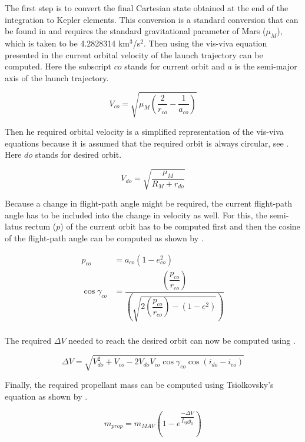 The first step is to convert the final Cartesian state obtained at the end of the integration to Kepler elements. This conversion is a standard conversion that can be found in \cite{wakker2010} and requires the standard gravitational parameter of Mars ($\mu_{M}$), which is taken to be 4.2828314 km$^{3}$/s$^{2}$. Then using the vis-viva equation presented in  the current orbital velocity of the launch trajectory can be computed. Here the subscript $co$ stands for current orbit and $a$ is the semi-major axis of the launch trajectory.

\begin{equation} \label{eq:visViva}
V_{co} = \sqrt{\mu_{M}\left(\dfrac{2}{r_{co}}-\dfrac{1}{a_{co}}\right)}
\end{equation}

Then he required orbital velocity is a simplified representation of the vis-viva equations because it is assumed that the required orbit is always circular, see . Here $do$ stands for desired orbit.

\begin{equation} \label{eq:simpVisViva}
V_{do}=\sqrt{\dfrac{\mu_{M}}{R_{M}+r_{do}}}
\end{equation} 

Because a change in flight-path angle might be required, the current flight-path angle has to be included into the change in velocity as well. For this, the semi-latus rectum ($p$) of the current orbit has to be computed first and then the cosine of the flight-path angle can be computed as shown by .


\begin{equation}\label{eq:cosFPA}
\begin{split}
p_{co}&=a_{co}\left(1-e_{co}^{2}\right)\\
\cos \gamma_{co}&=\dfrac{\left(\dfrac{p_{co}}{r_{co}}\right)}{\left(\sqrt{2\left(\dfrac{p_{co}}{r_{co}}\right)-\left(1-e^{2}\right)}\right)}\\
\end{split}
\end{equation}

The required $\Delta V$ needed to reach the desired orbit can now be computed using .

\begin{equation} \label{eq:requiredDeltaV}
\Delta V = \sqrt{V_{do}^{2}+V_{co}-2V_{do}V_{co}\cos \gamma_{co}\cos\left(i_{do}-i_{co}\right)}
\end{equation}

Finally, the required propellant mass can be computed using Tsiolkovsky's equation as shown by .

\begin{equation} \label{eq:propellantMass}
m_{prop} = m_{MAV}\left(1-e^{\dfrac{-\Delta V}{I_{sp}g_{0}}}\right)
\end{equation}
%

%
